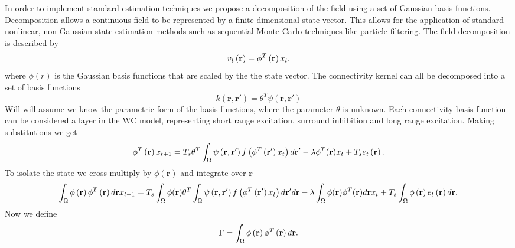 \documentclass[onecolumn,draftcls]{IEEEtran}
\begin{document}
In order to implement standard estimation techniques we propose a decomposition of the field using a set of Gaussian basis functions. Decomposition allows a continuous field to be represented by a finite dimensional state vector. This allows for the application of standard nonlinear, non-Gaussian state estimation methods such as sequential Monte-Carlo techniques like particle filtering. The field decomposition is described by
\begin{equation}\label{DefFieldDecomp}
{v_t}\left( {\bf{r}} \right) = {\phi ^T}\left( {\bf{r}} \right){x_t}.
\end{equation}
where $\phi(r)$ is the Gaussian basis functions that are scaled by the the state vector. The connectivity kernel can all be decomposed into a set of basis functions
\begin{equation}\label{DefKernelDecomp}
k( \mathbf{r} , \mathbf{r'} ) = \theta^T\psi(\mathbf{r} , \mathbf{r'} )
\end{equation}
Will will assume we know the parametric form of the basis functions, where the parameter $\theta$ is unknown. Each connectivity basis function can be considered a layer in the WC model, representing short range excitation, surround inhibition and long range excitation. Making substitutions we get
\begin{equation}\label{DecompModel}
{\phi ^T}\left( \mathbf{r} \right){x_{t+1}} = T_s\theta^T\int_\Omega  {\psi \left( {{\bf{r}} , {\mathbf{r'}}} \right)f\left( {{\phi ^T}\left( {{\mathbf{r'}}} \right){x_t}} \right)d{\mathbf{r'}}}  - \lambda\phi^T(\mathbf{r})x_t + T_s{e_t}\left( {\mathbf{r}} \right).
\end{equation}
To isolate the state we cross multiply by $\phi(\mathbf{r})$ and integrate over $\mathbf{r}$
\begin{equation}\label{Poo}
\int_\Omega  {\phi \left( {\bf{r}} \right){\phi ^T}\left( {\bf{r}} \right)d{\bf{r}}{x_{t+1}}}  = T_s\int_\Omega  {\phi ( \mathbf{r} )\theta^T\int_\Omega  {\psi \left( {{\bf{r}} , {\bf{r'}}} \right)f\left( {{\phi ^T}\left( {{\bf{r'}}} \right){x_t}} \right)d{\bf{r'}}} d{\bf{r}}}  - \lambda\int_\Omega \phi(\mathbf{r})\phi^T(\mathbf{r})d\mathbf{r} x_t  + T_s\int_\Omega  {\phi \left( {\mathbf{r}} \right)e_t\left( {\mathbf{r}} \right)d{\mathbf{r}}}.
\end{equation}
Now we define
\begin{equation}\label{DefGamma}
\Gamma  = \int_\Omega  {\phi \left( {\bf{r}} \right){\phi ^T}\left( {\bf{r}} \right)d{\bf{r}}}.
\end{equation}
\end{document}
